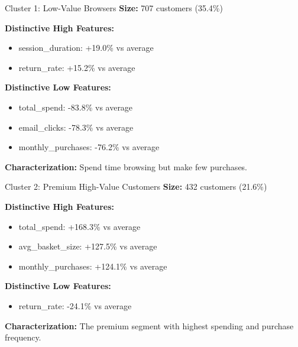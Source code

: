 \documentclass[aspectratio=169,ignorenonframetext]{beamer}
\begin{document}
\begin{frame}{Cluster 1: Low-Value Browsers}
\textbf{Size:} 707 customers (35.4\%)

\textbf{Distinctive High Features:}

\begin{itemize}
\item
  session\_duration: +19.0\% vs average
\item
  return\_rate: +15.2\% vs average
\end{itemize}

\textbf{Distinctive Low Features:}

\begin{itemize}
\item
  total\_spend: -83.8\% vs average
\item
  email\_clicks: -78.3\% vs average
\item
  monthly\_purchases: -76.2\% vs average
\end{itemize}

\textbf{Characterization:} Spend time browsing but make few purchases.
\end{frame}

\begin{frame}{Cluster 2: Premium High-Value Customers}
\textbf{Size:} 432 customers (21.6\%)

\textbf{Distinctive High Features:}

\begin{itemize}
\item
  total\_spend: +168.3\% vs average
\item
  avg\_basket\_size: +127.5\% vs average
\item
  monthly\_purchases: +124.1\% vs average
\end{itemize}

\textbf{Distinctive Low Features:}

\begin{itemize}
\item
  return\_rate: -24.1\% vs average
\end{itemize}

\textbf{Characterization:} The premium segment with highest spending and
purchase frequency.
\end{frame}
\end{document}
